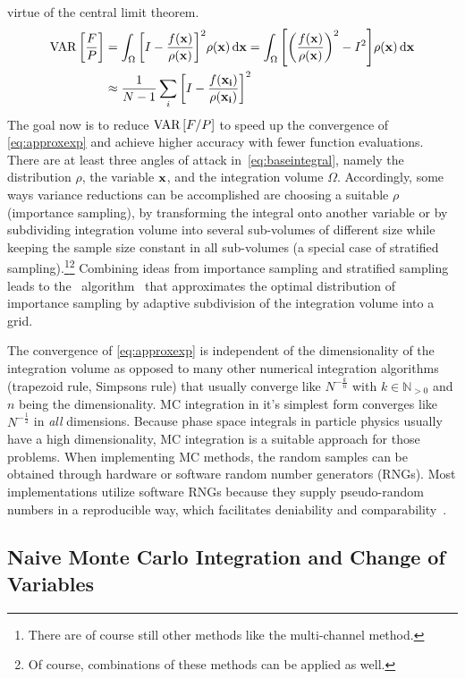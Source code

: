 virtue of the central limit theorem.
%
\begin{align}
  \operatorname{VAR}\qty[\frac{F}{P}] &= \int_\Omega \qty[I -
  \frac{f(\vb{x})}{\rho(\vb{x})}]^2 \rho({\vb{x}}) \dd{\vb{x}} =
  \int_\Omega \qty[\qty(\frac{f(\vb{x})}{\rho(\vb{x})})^2 -
  I^2]\rho({\vb{x}}) \dd{\vb{x}}   \label{eq:varI}
 \\
  &\approx \frac{1}{N - 1}\sum_i \qty[I -
  \frac{f(\vb{x_i})}{\rho(\vb{x_i})}]^2  \label{eq:varI-approx}
\end{align}
%
The goal now is to reduce \(\operatorname{VAR}\qty[F/P]\) to speed up the convergence
of \cref{eq:approxexp} and achieve higher accuracy with fewer function
evaluations. There are at least three angles of attack
in~\ref{eq:baseintegral}, namely the distribution \(\rho\), the
variable \(\vb{x}\), and the integration volume
\(\Omega\). Accordingly, some ways variance reductions can be
accomplished are choosing a suitable \(\rho\) (importance sampling),
by transforming the integral onto another variable or by subdividing
integration volume into several sub-volumes of different size while
keeping the sample size constant in all sub-volumes (a special case of
stratified sampling).\footnote{There are of course still other methods
  like the multi-channel method.}\footnote{Of course, combinations of
  these methods can be applied as well.}  Combining ideas from
importance sampling and stratified sampling leads to the \vegas\
algorithm~\cite{Lepage:19781an} that approximates the optimal
distribution of importance sampling by adaptive subdivision of the
integration volume into a grid.

The convergence of \cref{eq:approxexp} is independent of the
dimensionality of the integration volume as opposed to many other
numerical integration algorithms (trapezoid rule, Simpsons rule) that
usually converge like \(N^{-\frac{k}{n}}\) with
\(k\in\mathbb{N}_{>0}\) and \(n\) being the dimensionality.  MC
integration in it's simplest form converges like \(N^{-\frac{1}{2}}\)
in \emph{all} dimensions. Because phase space integrals in particle
physics usually have a high dimensionality, MC integration is a
suitable approach for those problems. When implementing MC methods,
the random samples can be obtained through hardware or software random
number generators (RNGs). Most implementations utilize software RNGs
because they supply pseudo-random numbers in a reproducible way, which
facilitates deniability and comparability~\cite{buckley:2011ge}.

\subsection{Naive Monte Carlo Integration and Change of Variables}
\label{sec:naivechange}

